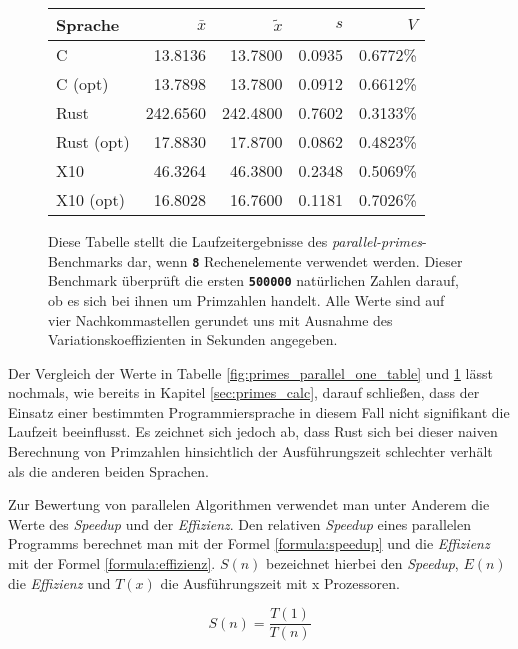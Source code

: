 \begin{figure}[hb]
	\begin{center}
		\begin{tabular}{lrrrr}
			\toprule
			Sprache & $\bar{x}$ & $\tilde{x}$ & $s$ & $V$ \\
			\midrule
			C          &  13.8136 &  13.7800 & 0.0935 & 0.6772\% \\
			C (opt)    &  13.7898 &  13.7800 & 0.0912 & 0.6612\% \\
			Rust       & 242.6560 & 242.4800 & 0.7602 & 0.3133\% \\
			Rust (opt) &  17.8830 &  17.8700 & 0.0862 & 0.4823\% \\
			X10        &  46.3264 &  46.3800 & 0.2348 & 0.5069\% \\
			X10 (opt)  &  16.8028 &  16.7600 & 0.1181 & 0.7026\% \\
			\bottomrule
		\end{tabular}
	\end{center}
	\caption{
		Diese Tabelle stellt die Laufzeitergebnisse des \textit{parallel-primes}-Benchmarks dar,
		wenn \texttt{\textsc{\textbf{8}}} Rechenelemente verwendet werden.
		Dieser Benchmark überprüft die ersten \texttt{\textsc{\textbf{500000}}} natürlichen Zahlen darauf,
		ob es sich bei ihnen um Primzahlen handelt.
		Alle Werte sind auf vier Nachkommastellen gerundet uns mit Ausnahme des Variationskoeffizienten
		in Sekunden angegeben.
	}
	\label{fig:primes_parallel_eight_table}
\end{figure}

Der Vergleich der Werte in Tabelle \ref{fig:primes_parallel_one_table} und \ref{fig:primes_parallel_eight_table} 
lässt nochmals, wie bereits in Kapitel \ref{sec:primes_calc}, darauf schließen, dass der Einsatz einer bestimmten
Programmiersprache in diesem Fall nicht signifikant die Laufzeit beeinflusst. Es zeichnet sich jedoch ab, dass
Rust sich bei dieser naiven Berechnung von Primzahlen hinsichtlich der Ausführungszeit schlechter verhält als
die anderen beiden Sprachen.

Zur Bewertung von parallelen Algorithmen verwendet man unter Anderem die Werte des \textit{Speedup}
und der \textit{Effizienz}.
Den relativen \textit{Speedup} eines parallelen Programms berechnet man mit der Formel \ref{formula:speedup} und die
\textit{Effizienz} mit der Formel \ref{formula:effizienz}. $S(n)$ bezeichnet hierbei den \textit{Speedup},
$E(n)$ die \textit{Effizienz} und $T(x)$ die Ausführungszeit mit x Prozessoren.

\begin{equation}
	\label{formula:speedup}
	S(n) = \frac{T(1)}{T(n)}
\end{equation}


